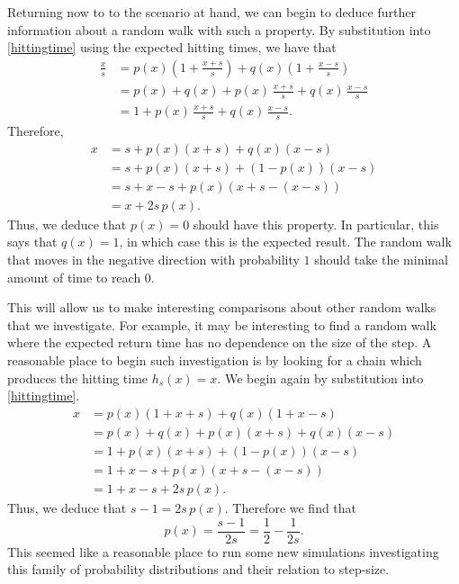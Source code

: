 Returning now to to the scenario at hand, we can begin to deduce further information about a random walk
with such a property. By substitution into \eqref{hittingtime} using the expected hitting times, we
have that
\begin{align*}
    \frac{x}{s} &= p(x)\left(1 + \frac{x+s}{s}\right) + q(x)\left(1 + \frac{x-s}{s}\right)\\
                &= p(x) + q(x) + p(x)\, \frac{x+s}{s} + q(x) \, \frac{x-s}{s} \\
                &= 1 + p(x)\, \frac{x+s}{s} + q(x) \, \frac{x-s}{s}.
\end{align*}
Therefore,
\begin{align*}
    x &= s + p(x)(x+s) + q(x)(x-s) \\
      &= s + p(x)(x+s) + (1-p(x))(x-s) \\
      &= s + x - s + p(x)(x + s - (x - s)) \\
      &= x + 2s\, p(x).
\end{align*}
Thus, we deduce that $p(x) = 0$ should have this property. In particular, this says that $q(x) = 1$, in
which case this is the expected result. The random walk that moves in the negative direction with
probability $1$ should take the minimal amount of time to reach $0$.

This will allow us to make interesting comparisons about other random walks that we investigate. For
example, it may be interesting to find a random walk where the expected return time has no dependence on
the size of the step. A reasonable place to begin such investigation is by looking for a chain which
produces the hitting time $h_s(x) = x$. We begin again by substitution into \eqref{hittingtime}.
\begin{align*}
    x &= p(x)(1 + x + s) + q(x)(1 + x - s) \\
      &= p(x) + q(x) + p(x)(x+s) + q(x)(x-s) \\
      &= 1 + p(x)(x+s) + (1-p(x))(x-s) \\
      &= 1 + x - s + p(x)(x+s - (x - s)) \\
      &= 1 + x - s + 2s\, p(x).
\end{align*}
Thus, we deduce that $s - 1 = 2s\, p(x)$. Therefore we find that
\[
    p(x) = \frac{s-1}{2s} = \frac{1}{2} - \frac{1}{2s}.
\]
This seemed like a reasonable place to run some new simulations investigating this family of probability
distributions and their relation to step-size.
